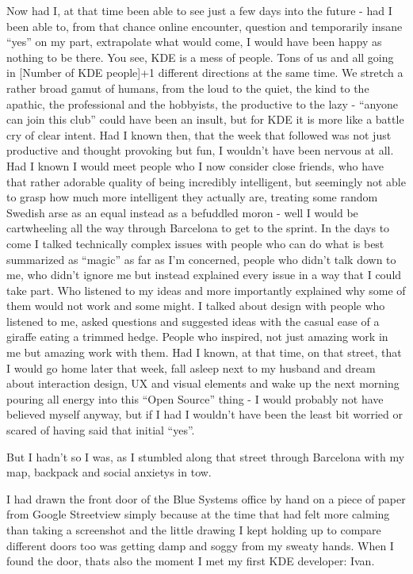 Now had I, at that time been able to see just a few days into the future - had I been able to, from that chance online encounter, question and temporarily insane “yes” on my part, extrapolate what would come, I would have been happy as nothing to be there. 
You see, KDE is a mess of people. Tons of us and all going in [Number of KDE people]+1 different directions at the same time. We stretch a rather broad gamut of humans, from the loud to the quiet, the kind to the apathic, the professional and the hobbyists, the productive to the lazy - “anyone can join this club” could have been an insult, but for KDE it is more like a battle cry of clear intent.
Had I known then, that the week that followed was not just productive and thought provoking but fun, I wouldn’t have been nervous at all. Had I known I would meet people who I now consider close friends, who have that rather adorable quality of being incredibly intelligent, but seemingly not able to grasp how much more intelligent they actually are, treating some random Swedish arse as an equal instead as a befuddled moron - well I would be cartwheeling all the way through Barcelona to get to the sprint. 
In the days to come I talked technically complex issues with people who can do what is best summarized as “magic” as far as I’m concerned, people who didn’t talk down to me, who didn’t ignore me but instead explained every issue in a way that I could take part. Who listened to my ideas and more importantly explained why some of them would not work and some might.
I talked about design with people who listened to me, asked questions and suggested ideas with the casual ease of a giraffe eating a trimmed hedge. People who inspired, not just amazing work in me but amazing work with them. 
Had I known, at that time, on that street, that I would go home later that week, fall asleep next to my husband and dream about interaction design, UX and visual elements and wake up the next morning pouring all energy into this “Open Source” thing - I would probably not have believed myself anyway, but if I had I wouldn’t have been the least bit worried or scared of having said that initial “yes”. 

But I hadn’t so I was, as I stumbled along that street through Barcelona with my map, backpack and social anxietys in tow.

I had drawn the front door of the Blue Systems office by hand on a piece of paper from Google Streetview simply because at the time that had felt more calming than taking a screenshot and the little drawing I kept holding up to compare different doors too was getting damp and soggy from my sweaty hands. When I found the door, thats also the moment I met my first KDE developer: Ivan.

